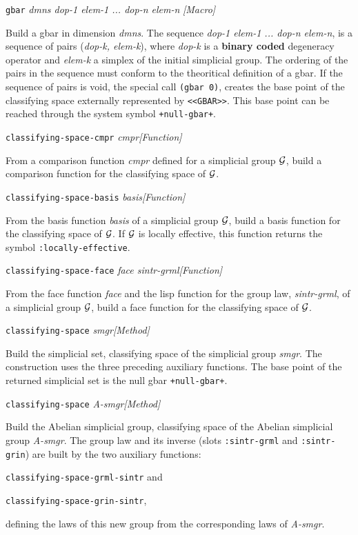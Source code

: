 {\parindent=0mm
{\leftskip=5mm
{\tt gbar} {\em dmns dop-1 elem-1 ... dop-n elem-n} \hfill {\em [Macro]} \par}
{\leftskip=15mm
Build a gbar in dimension {\em dmns}. The sequence {\em dop-1 elem-1 ... dop-n elem-n},
is a sequence of pairs ({\em dop-k, elem-k}), where {\em dop-k} is  a {\bf binary coded}
degeneracy operator and {\em elem-k} a simplex of the initial simplicial group. The ordering of
the pairs in the sequence must conform to the theoritical definition of a gbar.
If the sequence of pairs is void, the special call {\tt (gbar 0)},
creates the base point of the classifying space
externally represented by {\tt <<GBAR>>}. This base point can be reached through
the system symbol {\tt +null-gbar+}. \par}
{\leftskip=5mm
{\tt classifying-space-cmpr} {\em cmpr}\hfill {\em [Function]} \par}
{\leftskip=15mm
From a comparison function {\em cmpr} defined for a simplicial group ${\cal G}$, build a
comparison function for the classifying space of ${\cal G}$. \par}
{\leftskip=5mm
{\tt classifying-space-basis} {\em basis}\hfill {\em [Function]} \par}
{\leftskip=15mm
From the basis function {\em basis} of a simplicial group ${\cal G}$, build a
basis function for the classifying space of ${\cal G}$. If ${\cal G}$ is locally effective,
this function returns the symbol {\tt :locally-effective}.\par}
{\leftskip=5mm
{\tt classifying-space-face} {\em face sintr-grml}\hfill {\em [Function]} \par}
{\leftskip=15mm
From the face function {\em face} and the lisp function for the group law, {\em sintr-grml},
of a simplicial group ${\cal G}$, build a
face function for the classifying space of ${\cal G}$. \par}
{\leftskip=5mm
{\tt classifying-space} {\em smgr}\hfill {\em [Method]} \par}
{\leftskip=15mm
Build the simplicial set, classifying space of the simplicial group {\em smgr}.
The construction uses the three preceding auxiliary functions. The base point
of the returned simplicial set is the null gbar {\tt +null-gbar+}. \par}
{\leftskip=5mm
{\tt classifying-space} {\em A-smgr}\hfill {\em [Method]} \par}
{\leftskip=15mm
Build the Abelian simplicial group, classifying space of the Abelian simplicial group {\em A-smgr}.
The group law and its inverse (slots {\tt :sintr-grml} and {\tt :sintr-grin}) are built
by the two auxiliary functions: \par}
{\leftskip=20mm
{\tt classifying-space-grml-sintr} and \par}
{\leftskip=20mm
{\tt classifying-space-grin-sintr}, \par}
{\leftskip=15mm
defining the laws of this new group from the corresponding laws of {\em A-smgr}. \par}
}

